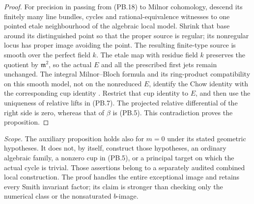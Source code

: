 \begin{proof}
For precision in passing from (PB.18) to Milnor cohomology, descend
its finitely many line bundles, cycles and rational-equivalence
witnesses to one pointed etale neighbourhood of the algebraic local
model. Shrink that base around its distinguished point so that the
proper source is regular; its nonregular locus has proper image
avoiding the point. The resulting finite-type source is smooth
over the perfect field $k$. The etale map with residue field $k$
preserves the quotient by $\mathfrak m^2$, so the actual $E$ and all
the prescribed first jets remain unchanged. The integral
Milnor--Bloch formula and its ring-product compatibility on this
smooth model, not on the nonreduced $E$, identify the Chow identity
with the corresponding cup identity
\citep[Theorems 7.1 and 7.5, author pp.~21--22]{cyKerz2009Milnor}
\citep[Section 3, diagram (22), pp.~557--558]{cyBraunling2013}.
Restrict that cup identity to $E$, and then use the uniqueness of
relative lifts in (PB.7). The projected relative differential of
the right side is zero, whereas that of $\beta$ is (PB.5).
This contradiction proves the proposition.
\end{proof}

\noindent\emph{Scope.}
The auxiliary proposition holds also for $m=0$ under its stated
geometric hypotheses. It does not, by itself, construct those
hypotheses, an ordinary algebraic family, a nonzero cup in (PB.5),
or a principal target on which the actual cycle is trivial.
Those assertions belong to a separately audited combined local
construction. The proof handles the entire exceptional image and
retains every Smith invariant factor; its claim is stronger than
checking only the numerical class or the nonsaturated $b$-image.
